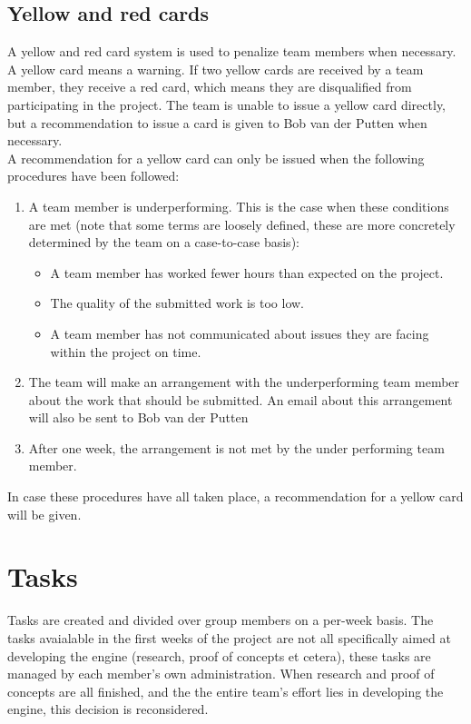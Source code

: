 \documentclass{article} %
\begin{document}
\subsection{Yellow and red cards}
A yellow and red card system is used to penalize team members when necessary.
A yellow card means a warning. If two yellow cards are received by a team member, they receive a red card, which means
they are disqualified from participating in the project.
The team is unable to issue a yellow card directly, but a recommendation to issue a card
is given to Bob van der Putten when necessary.
\\
A recommendation for a yellow card can only be issued when the following procedures have been followed:
\begin{enumerate}
    \item A team member is underperforming. This is the case when these conditions are met (note that some terms are loosely defined, these are more concretely determined by the team on a case-to-case basis):
          \begin{itemize}
              \item A team member has worked fewer hours than expected on the project.
              \item The quality of the submitted work is too low.
              \item A team member has not communicated about issues they are facing within the project on time.
          \end{itemize}
    \item The team will make an arrangement with the underperforming team member about the work that should be submitted.
          An email about this arrangement will also be sent to Bob van der Putten
    \item After one week, the arrangement is not met by the under performing team member.
\end{enumerate}
In case these procedures have all taken place, a recommendation for a yellow card will be given.


\newpage

\section{Tasks}
Tasks are created and divided over group members on a per-week basis.
The tasks avaialable in the first weeks of the project are not all specifically aimed at developing the engine (research, proof of concepts et cetera), these tasks are managed by each member's own administration.
When research and proof of concepts are all finished, and the the entire team's effort lies in developing the engine, this decision is reconsidered.
\end{document}
